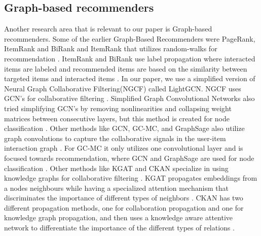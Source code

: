 \subsection{Graph-based recommenders}
Another research area that is relevant to our paper is Graph-based recommenders.
Some of the earlier Graph-Based Recommenders were PageRank, ItemRank and BiRank and ItemRank that utilizes random-walks for recommendation \cite{PageRank,BiRank,ItemRank}.
ItemRank and BiRank use label propagation where interacted items are labeled and recommended items are based on the similarity between targeted items and interacted items \cite{BiRank,ItemRank}.
In our paper, we use a simplified version of Neural Graph Collaborative Filtering(NGCF) called LightGCN.
NGCF uses GCN's for collaborative filtering \cite{lightgcn,NGCF_2019}.
Simplified Graph Convolutional Networks also tried simplifying GCN's by removing nonlinearities and collapsing weight matrices between consecutive layers, but this method is created for node classification \cite{lightgcn,SGCN}.
Other methods like GCN, GC-MC, and GraphSage also utilize graph convolutions to capture the collaborative signals in the user-item interaction graph \cite{GCN,GC_MC,GraphSage}.
For GC-MC it only utilizes one convolutional layer and is focused towards recommendation\cite{GC_MC}, where GCN and GraphSage are used for node classification \cite{GCN,GraphSage}.
Other methods like KGAT and CKAN specialize in using knowledge graphs for collaborative filtering \cite{KGAT,CKAN}.
KGAT propagates embeddings from a nodes neighbours while having a specialized attention mechanism that discriminates the importance of different types of neighbors \cite{KGAT}.
CKAN has two different propagation methods, one for collaboration propagation and one for knowledge graph propagation, and then uses a knowledge aware attentive network to differentiate the importance of the different types of relations \cite{CKAN}.


